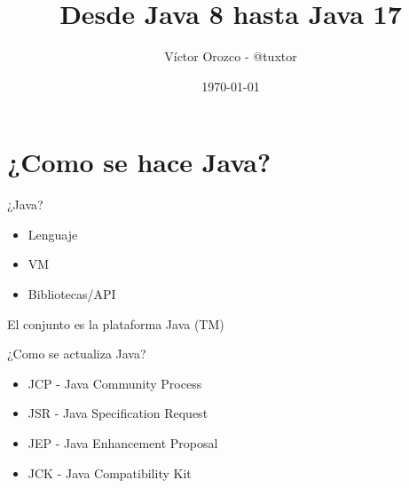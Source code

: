 \documentclass[aspectratio=169]{beamer}
\title{Desde Java 8 hasta Java 17}
\author{Víctor Orozco - @tuxtor}
\institute{Nabenik}
\date{\today}
\begin{document}
{
    \frame{\titlepage}
}


\begin{frame}
    \tableofcontents
\end{frame}


\section{¿Como se hace Java?}

\begin{frame}[fragile]{¿Java?}
	\begin{itemize}
		\item Lenguaje
		\item VM
		\item Bibliotecas/API
	\end{itemize}

El conjunto es la plataforma Java (TM)
	
\end{frame}

\begin{frame}[fragile]{¿Como se actualiza Java?}
	\begin{itemize}
		\item JCP - Java Community Process
		\item JSR - Java Specification Request
		\item JEP - Java Enhancement Proposal
		\item JCK - Java Compatibility Kit
	\end{itemize}	
\end{frame}
\end{document}
